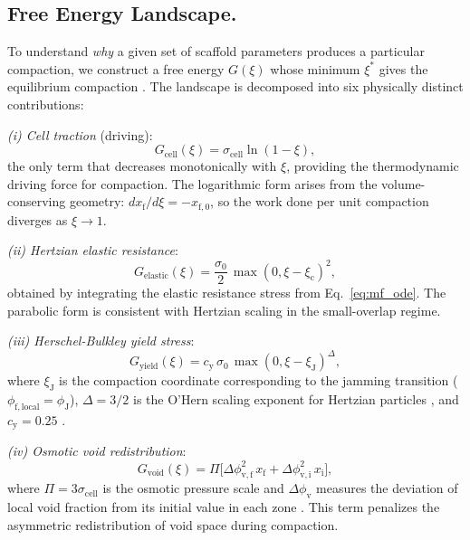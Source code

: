 \documentclass[9pt,twocolumn,twoside]{pnas-new}
\newcommand{\phiJ}{\phi_\mathrm{J}}
\newcommand{\xf}{x_\mathrm{f}}
\newcommand{\xistar}{\xi^{*}}
\newcommand{\sigmacell}{\sigma_\mathrm{cell}}
\newcommand{\sigmazero}{\sigma_0}
\begin{document}
\subsection*{Free Energy Landscape.}

To understand \textit{why} a given set of scaffold parameters produces a
particular compaction, we construct a free energy $G(\xi)$ whose minimum
$\xistar$ gives the equilibrium compaction \cite{Wales2003}. The landscape
is decomposed into six physically distinct contributions:

\textit{(i) Cell traction} (driving):
\begin{equation}\label{eq:Gcell}
  G_\mathrm{cell}(\xi) = \sigmacell \ln(1 - \xi),
\end{equation}
the only term that decreases monotonically with $\xi$, providing the
thermodynamic driving force for compaction. The logarithmic form arises from
the volume-conserving geometry: $d\xf/d\xi = -x_{\mathrm{f},0}$, so the
work done per unit compaction diverges as $\xi \to 1$.

\textit{(ii) Hertzian elastic resistance}:
\begin{equation}\label{eq:Gelastic}
  G_\mathrm{elastic}(\xi) = \frac{\sigmazero}{2}\,\max(0, \xi - \xi_\mathrm{c})^2,
\end{equation}
obtained by integrating the elastic resistance stress from
Eq.~\ref{eq:mf_ode}. The parabolic form is consistent with Hertzian scaling
in the small-overlap regime.

\textit{(iii) Herschel-Bulkley yield stress}:
\begin{equation}\label{eq:Gyield}
  G_\mathrm{yield}(\xi) = c_\mathrm{y}\, \sigmazero\, \max(0, \xi - \xi_\mathrm{J})^\Delta,
\end{equation}
where $\xi_\mathrm{J}$ is the compaction coordinate corresponding to the
jamming transition ($\phi_\mathrm{f,local} = \phiJ$), $\Delta = 3/2$ is
the O'Hern scaling exponent for Hertzian particles \cite{OHern2003}, and
$c_\mathrm{y} = 0.25$ \cite{Olsson2007,Olsson2012}.

\textit{(iv) Osmotic void redistribution}:
\begin{equation}\label{eq:Gvoid}
  G_\mathrm{void}(\xi) = \Pi \bigl[\Delta\phi_{\mathrm{v,f}}^2\, \xf
  + \Delta\phi_{\mathrm{v,i}}^2\, x_\mathrm{i}\bigr],
\end{equation}
where $\Pi = 3\sigmacell$ is the osmotic pressure scale and
$\Delta\phi_\mathrm{v}$ measures the deviation of local void fraction from
its initial value in each zone \cite{Biot1941,Princen1986}. This term
penalizes the asymmetric redistribution of void space during compaction.
\end{document}
